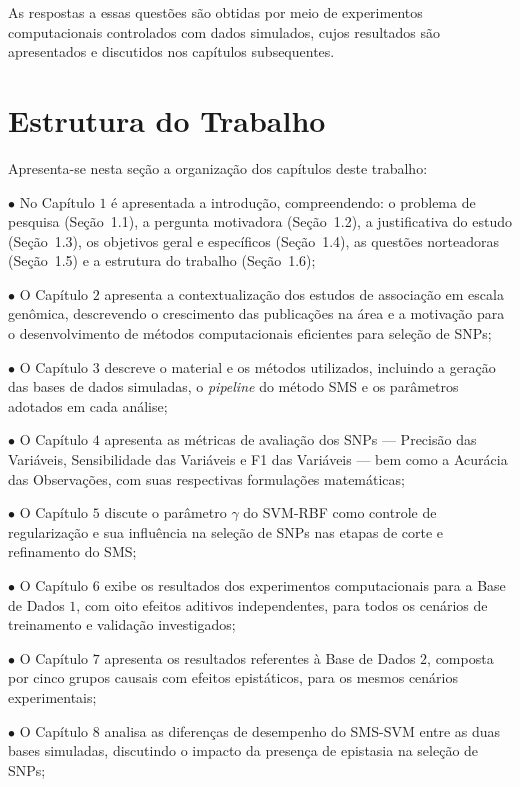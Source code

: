 \documentclass[
    12pt,
    a4paper,
    oneside,
    english,
    french,
    spanish,
    brazil
    ]{abntex2}
\begin{document}
\bigskip
\noindent As respostas a essas questões são obtidas por meio de experimentos computacionais controlados com dados simulados, cujos resultados são apresentados e discutidos nos capítulos subsequentes.

\section{Estrutura do Trabalho}

Apresenta-se nesta seção a organização dos capítulos deste trabalho:

$\bullet$ No Capítulo $1$ é apresentada a introdução, compreendendo: o problema de pesquisa (Seção~1.1), a pergunta motivadora (Seção~1.2), a justificativa do estudo (Seção~1.3), os objetivos geral e específicos (Seção~1.4), as questões norteadoras (Seção~1.5) e a estrutura do trabalho (Seção~1.6);

$\bullet$ O Capítulo $2$ apresenta a contextualização dos estudos de associação em escala genômica, descrevendo o crescimento das publicações na área e a motivação para o desenvolvimento de métodos computacionais eficientes para seleção de SNPs;

$\bullet$ O Capítulo $3$ descreve o material e os métodos utilizados, incluindo a geração das bases de dados simuladas, o \textit{pipeline} do método SMS e os parâmetros adotados em cada análise;

$\bullet$ O Capítulo $4$ apresenta as métricas de avaliação dos SNPs --- Precisão das Variáveis, Sensibilidade das Variáveis e F1 das Variáveis --- bem como a Acurácia das Observações, com suas respectivas formulações matemáticas;

$\bullet$ O Capítulo $5$ discute o parâmetro $\gamma$ do SVM-RBF como controle de regularização e sua influência na seleção de SNPs nas etapas de corte e refinamento do SMS;

$\bullet$ O Capítulo $6$ exibe os resultados dos experimentos computacionais para a Base de Dados $1$, com oito efeitos aditivos independentes, para todos os cenários de treinamento e validação investigados;

$\bullet$ O Capítulo $7$ apresenta os resultados referentes à Base de Dados $2$, composta por cinco grupos causais com efeitos epistáticos, para os mesmos cenários experimentais;

$\bullet$ O Capítulo $8$ analisa as diferenças de desempenho do SMS-SVM entre as duas bases simuladas, discutindo o impacto da presença de epistasia na seleção de SNPs;
\end{document}

